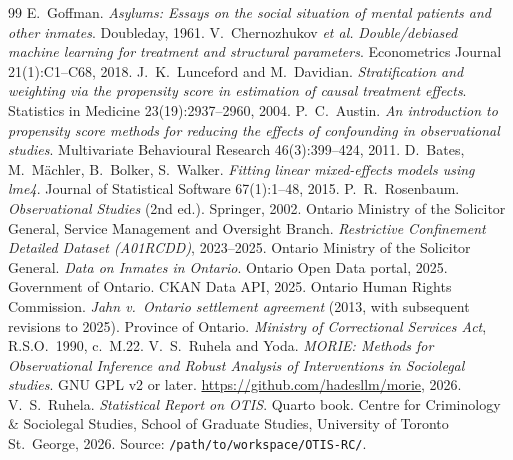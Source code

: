 \documentclass[11pt,a4paper]{article}
\newcommand{\1}{\mathbf{1}}
\theoremstyle{plain}
\theoremstyle{definition}
\begin{document}
\begin{thebibliography}{99}\small
{} E.~Goffman.
  \emph{Asylums: Essays on the social situation of mental patients
  and other inmates}. Doubleday, 1961.
 V.~Chernozhukov \emph{et al.}
  \emph{Double/debiased machine learning for treatment and
  structural parameters}. Econometrics Journal 21(1):C1--C68, 2018.
 J.~K.~Lunceford and M.~Davidian.
  \emph{Stratification and weighting via the propensity score in
  estimation of causal treatment effects}. Statistics in Medicine
  23(19):2937--2960, 2004.
 P.~C.~Austin.
  \emph{An introduction to propensity score methods for reducing
  the effects of confounding in observational studies}.
  Multivariate Behavioural Research 46(3):399--424, 2011.
 D.~Bates, M.~Mächler, B.~Bolker, S.~Walker.
  \emph{Fitting linear mixed-effects models using lme4}.
  Journal of Statistical Software 67(1):1--48, 2015.
 P.~R.~Rosenbaum.
  \emph{Observational Studies} (2nd ed.). Springer, 2002.
  Ontario Ministry of the Solicitor General, Service Management
  and Oversight Branch.
  \emph{Restrictive Confinement Detailed Dataset (A01RCDD)},
  2023--2025.
  Ontario Ministry of the Solicitor General.
  \emph{Data on Inmates in Ontario}.
  Ontario Open Data portal, 2025.
  Government of Ontario.  CKAN Data API, 2025.
  Ontario Human Rights Commission.
  \emph{Jahn v.\ Ontario settlement agreement} (2013, with
  subsequent revisions to 2025).
  Province of Ontario.
  \emph{Ministry of Correctional Services Act}, R.S.O.\ 1990,
  c.\ M.22.
  V.~S.~Ruhela and Yoda. \emph{MORIE: Methods for Observational
  Inference and Robust Analysis of Interventions in Sociolegal
  studies}.  GNU GPL v2 or later.
  \url{https://github.com/hadesllm/morie}, 2026.
  V.~S.~Ruhela.  \emph{Statistical Report on OTIS}.
  Quarto book.  Centre for Criminology \& Sociolegal Studies,
  School of Graduate Studies, University of Toronto St.\ George,
  2026.  Source: \texttt{/path/to/workspace/OTIS-RC/}.
\end{thebibliography}
\end{document}
